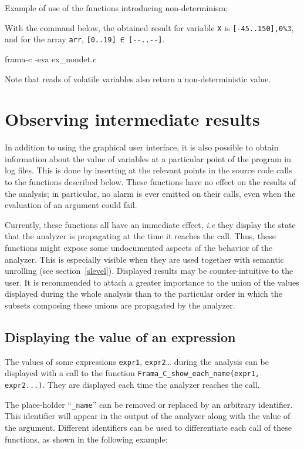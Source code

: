 \documentclass{frama-c-book}
\begin{document}
Example of use of the functions introducing non-determinism:

With the command below, the obtained result for
variable \lstinline|X| is \lstinline|[-45..150],0%3|, and for the
array \lstinline|arr|, \lstinline|[0..19] ∈ [--..--]|.
\begin{frama-c-commands}
frama-c -eva ex_nondet.c
\end{frama-c-commands}

Note that reads of volatile variables also return a non-deterministic
value.

\section{Observing intermediate results}
\label{builtins_observation}

In addition to using the graphical user interface, it is also possible
to obtain information about the value of variables at a particular
point of the program in log files. This is done by inserting at the
relevant points in the source code calls to the functions described below.
These functions have no effect on the results of the analysis; in particular,
no alarm is ever emitted on their calls, even when the evaluation of an
argument could fail.

Currently, these functions all have an immediate effect, {\it i.e} they display
the state that the analyzer is propagating at the time it reaches the
call. Thus, these functions might expose some undocumented aspects of the
behavior of the analyzer. This is especially visible when they are used together
with semantic unrolling (see section~\ref{slevel}). Displayed results may be
counter-intuitive to the user. It is recommended to attach a greater importance
to the union of the values displayed during the whole analysis than to the
particular order in which the subsets composing these unions are propagated
by the analyzer.

\subsection{Displaying the value of an expression}

The values of some expressions \lstinline|expr1|, \lstinline|expr2|… during the
analysis can be displayed with a call to the function
\lstinline|Frama_C_show_each_name(expr1, expr2...)|. They are displayed each
time the analyzer reaches the call.

The place-holder ``\lstinline|_name|'' can be removed or replaced by an arbitrary
identifier.  This identifier will appear in the output of the analyzer along
with the value of the argument. Different identifiers can be used to
differentiate each call of these functions, as shown in the following example:
\end{document}
